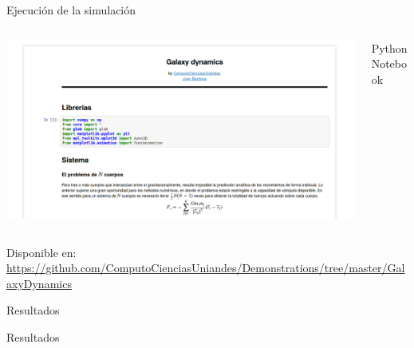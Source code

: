 \documentclass[handout]{beamer}
\begin{document}
\begin{frame}{Ejecuci\'on de la simulaci\'on}
	\begin{columns}
		\begin{column}{0.75\textwidth}
			\includegraphics[height=0.5\textheight]{sources/images/screen.png}
		\end{column}
		\begin{column}{0.25\textwidth}
			Python Notebook
		\end{column}
	\end{columns}
	Disponible en:
	\tiny
	\url{https://github.com/ComputoCienciasUniandes/Demonstrations/tree/master/GalaxyDynamics}
	\normalsize
\end{frame}
\begin{frame}{Resultados}
	\centering
	\\
\end{frame}
\begin{frame}{Resultados}
	\centering
	\\
\end{frame}
\end{document}
